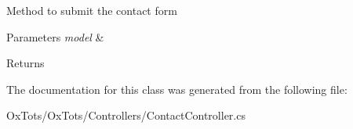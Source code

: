 Method to submit the contact form 


\begin{DoxyParams}{Parameters}
{\em model} & \\
\hline
\end{DoxyParams}
\begin{DoxyReturn}{Returns}

\end{DoxyReturn}


The documentation for this class was generated from the following file\+:\begin{DoxyCompactItemize}
\item 
Ox\+Tots/\+Ox\+Tots/\+Controllers/Contact\+Controller.\+cs\end{DoxyCompactItemize}
